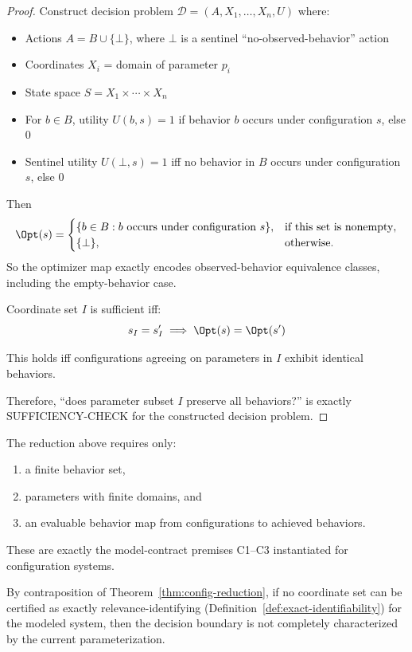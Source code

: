 \begin{proof}
Construct decision problem $\mathcal{D} = (A, X_1, \ldots, X_n, U)$ where:
\begin{itemize}
\item Actions $A = B \cup \{\bot\}$, where $\bot$ is a sentinel ``no-observed-behavior'' action
\item Coordinates $X_i$ = domain of parameter $p_i$
\item State space $S = X_1 \times \cdots \times X_n$
\item For $b\in B$, utility $U(b, s) = 1$ if behavior $b$ occurs under configuration $s$, else $0$
\item Sentinel utility $U(\bot,s)=1$ iff no behavior in $B$ occurs under configuration $s$, else $0$
\end{itemize}

Then
\[
\Opt(s)=
\begin{cases}
\{b \in B : b \text{ occurs under configuration } s\}, & \text{if this set is nonempty},\\
\{\bot\}, & \text{otherwise}.
\end{cases}
\]
So the optimizer map exactly encodes observed-behavior equivalence classes, including the empty-behavior case.

Coordinate set $I$ is sufficient iff:
\[
s_I = s'_I \implies \Opt(s) = \Opt(s')
\]

This holds iff configurations agreeing on parameters in $I$ exhibit identical behaviors.

Therefore, ``does parameter subset $I$ preserve all behaviors?'' is exactly SUFFICIENCY-CHECK for the constructed decision problem.
\end{proof}

\begin{remark}
The reduction above requires only:
\begin{enumerate}
\item a finite behavior set,
\item parameters with finite domains, and
\item an evaluable behavior map from configurations to achieved behaviors.
\end{enumerate}
These are exactly the model-contract premises C1--C3 instantiated for configuration systems.
\end{remark}

\begin{theorem}
\label{thm:overmodel-diagnostic}
By contraposition of Theorem~\ref{thm:config-reduction}, if no coordinate set can be certified as exactly relevance-identifying (Definition~\ref{def:exact-identifiability}) for the modeled system, then the decision boundary is not completely characterized by the current parameterization.
\end{theorem}

